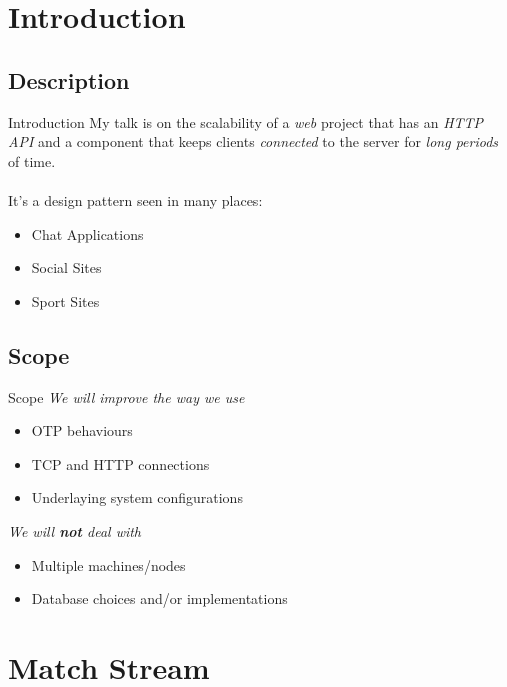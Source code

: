 \documentclass[utf8]{beamer}
\begin{document}
\section{Introduction}
\subsection{Description}
\begin{frame}{Introduction}
	My talk is on the scalability of a \emph{web} project \pause that has an \emph{HTTP API} \pause and a component that keeps clients \emph{connected} to the server for \emph{long periods} of time.\\ ~ \\ \pause
	It's a design pattern seen in many places:
	\begin{itemize}
		\item Chat Applications
		\item Social Sites
		\item Sport Sites
	\end{itemize}
\end{frame}

\subsection{Scope}
\begin{frame}{Scope}
	\emph{We will improve the way we use}
	\begin{itemize}
		\item OTP behaviours
		\item TCP and HTTP connections
		\item Underlaying system configurations
	\end{itemize}
	\pause
	\emph{We will \textbf{not} deal with}
	\begin{itemize}
		\item Multiple machines/nodes
		\item Database choices and/or implementations
	\end{itemize}
\end{frame}

\section{Match Stream}
\end{document}

